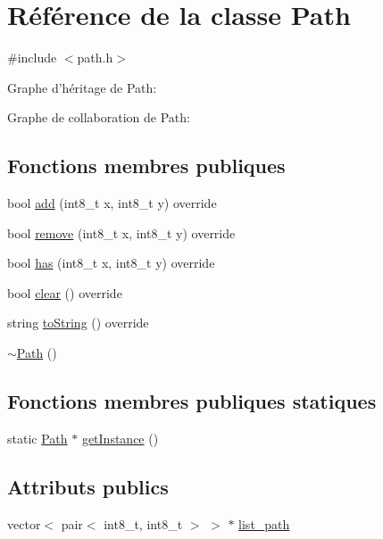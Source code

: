\hypertarget{class_path}{\section{Référence de la classe Path}
\label{class_path}
}


{\ttfamily \#include $<$path.\-h$>$}



Graphe d'héritage de Path\-:


Graphe de collaboration de Path\-:
\subsection*{Fonctions membres publiques}
\begin{DoxyCompactItemize}
\item 
bool \hyperlink{class_path_a0b82136bc60497245fef11070a74061b}{add} (int8\-\_\-t x, int8\-\_\-t y) override
\item 
bool \hyperlink{class_path_a9c22f1b57641acc96547bc8aa04f0fe5}{remove} (int8\-\_\-t x, int8\-\_\-t y) override
\item 
bool \hyperlink{class_path_ad2879954ff083fe85ea7e494fb7d1793}{has} (int8\-\_\-t x, int8\-\_\-t y) override
\item 
bool \hyperlink{class_path_a962e54c19be5fbe17f902ee6a7a3a706}{clear} () override
\item 
string \hyperlink{class_path_ae9094dd83cfcbe9139a41f7aabda84ce}{to\-String} () override
\item 
\hyperlink{class_path_a141da9ff89c85e0ba410b5a73864c267}{$\sim$\-Path} ()
\end{DoxyCompactItemize}
\subsection*{Fonctions membres publiques statiques}
\begin{DoxyCompactItemize}
\item 
static \hyperlink{class_path}{Path} $\ast$ \hyperlink{class_path_a183700997f2499f31dc2a533c9ace59a}{get\-Instance} ()
\end{DoxyCompactItemize}
\subsection*{Attributs publics}
\begin{DoxyCompactItemize}
\item 
vector$<$ pair$<$ int8\-\_\-t, int8\-\_\-t $>$ $>$ $\ast$ \hyperlink{class_path_a1aeccb79c82441549c27f7874f78856e}{list\-\_\-path}
\end{DoxyCompactItemize}
